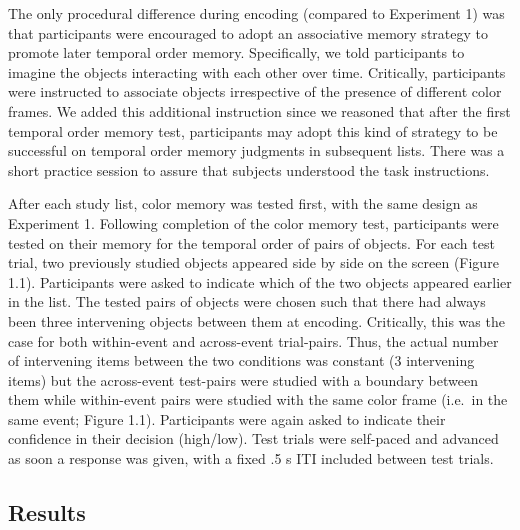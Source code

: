 The only procedural difference during encoding (compared to Experiment
1) was that participants were encouraged to adopt an associative memory
strategy to promote later temporal order memory. Specifically, we told
participants to imagine the objects interacting with each other over
time. Critically, participants were instructed to associate objects
irrespective of the presence of different color frames. We added this
additional instruction since we reasoned that after the first temporal
order memory test, participants may adopt this kind of strategy to be
successful on temporal order memory judgments in subsequent lists. There
was a short practice session to assure that subjects understood the task
instructions.

After each study list, color memory was tested first, with the same
design as Experiment 1. Following completion of the color memory test,
participants were tested on their memory for the temporal order of pairs
of objects. For each test trial, two previously studied objects appeared
side by side on the screen (Figure 1.1). Participants were asked to
indicate which of the two objects appeared earlier in the list. The
tested pairs of objects were chosen such that there had always been
three intervening objects between them at encoding. Critically, this was
the case for both within-event and across-event trial-pairs. Thus, the
actual number of intervening items between the two conditions was
constant (3 intervening items) but the across-event test-pairs were
studied with a boundary between them while within-event pairs were
studied with the same color frame (i.e.~in the same event; Figure 1.1).
Participants were again asked to indicate their confidence in their
decision (high/low). Test trials were self-paced and advanced as soon a
response was given, with a fixed .5 s ITI included between test trials.

\subsection{Results}\label{results-1}

